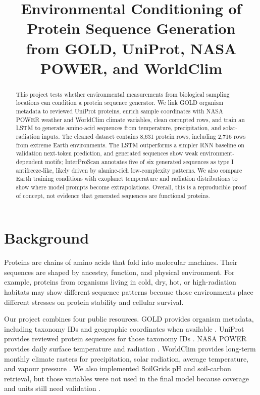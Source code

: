 \documentclass[11pt]{article}
\title{Environmental Conditioning of Protein Sequence Generation\\
       from GOLD, UniProt, NASA POWER, and WorldClim}
\date{}
\begin{document}
\maketitle

\begin{abstract}
This project tests whether environmental measurements from biological sampling
locations can condition a protein sequence generator. We link GOLD organism
metadata to reviewed UniProt proteins, enrich sample coordinates with NASA POWER
weather and WorldClim climate variables, clean corrupted rows, and train an LSTM
to generate amino-acid sequences from temperature, precipitation, and
solar-radiation inputs. The cleaned dataset contains 8,631 protein rows,
including 2,716 rows from extreme Earth environments. The LSTM outperforms a
simpler RNN baseline on validation next-token prediction, and generated
sequences show weak environment-dependent motifs; InterProScan annotates five of
six generated sequences as type I antifreeze-like, likely driven by
alanine-rich low-complexity patterns. We also compare Earth training conditions
with exoplanet temperature and radiation distributions to show where model
prompts become extrapolations. Overall, this is a reproducible proof of concept,
not evidence that generated sequences are functional proteins.
\end{abstract}

\section{Background}
Proteins are chains of amino acids that fold into molecular machines. Their
sequences are shaped by ancestry, function, and physical environment. For
example, proteins from organisms living in cold, dry, hot, or high-radiation
habitats may show different sequence patterns because those environments place
different stresses on protein stability and cellular survival.

Our project combines four public resources. GOLD provides organism metadata,
including taxonomy IDs and geographic coordinates when available \cite{gold}.
UniProt provides reviewed protein sequences for those taxonomy IDs
\cite{uniprot}. NASA POWER provides daily surface temperature and radiation
\cite{nasa}. WorldClim provides long-term monthly climate rasters for
precipitation, solar radiation, average temperature, and vapour pressure
\cite{worldclim}. We also implemented SoilGrids pH and soil-carbon retrieval,
but those variables were not used in the final model because coverage and units
still need validation \cite{soilgrids}.
\end{document}
